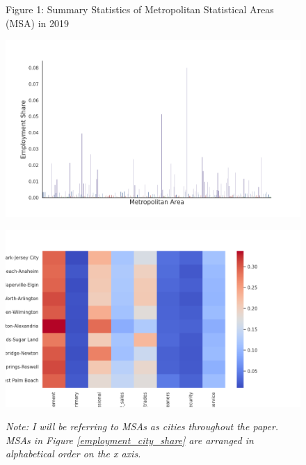 \documentclass[10pt]{article}
\begin{document}
\begin{figure}[!htb]
    \centering
    Figure 1: Summary Statistics of Metropolitan Statistical Areas (MSA) in 2019\par\medskip
    \begin{minipage}{0.48\textwidth}
        \centering
        \includegraphics[width=\textwidth]{../../estimations/graphs/city_employment_share.png}
        \label{employment_city_share}
    \end{minipage}\hfill
    \begin{minipage}{0.48\textwidth}
        \centering
        \includegraphics[width=\textwidth]{../../estimations/graphs/top_25_city_heatmap.png}
        \label{top_25_city_heatmap}
    \end{minipage}
    \caption*{\small\textit{Note: I will be referring to MSAs as cities throughout the paper. MSAs in Figure \ref{employment_city_share} are arranged in alphabetical order on the x axis.}}
\end{figure}
\end{document}
